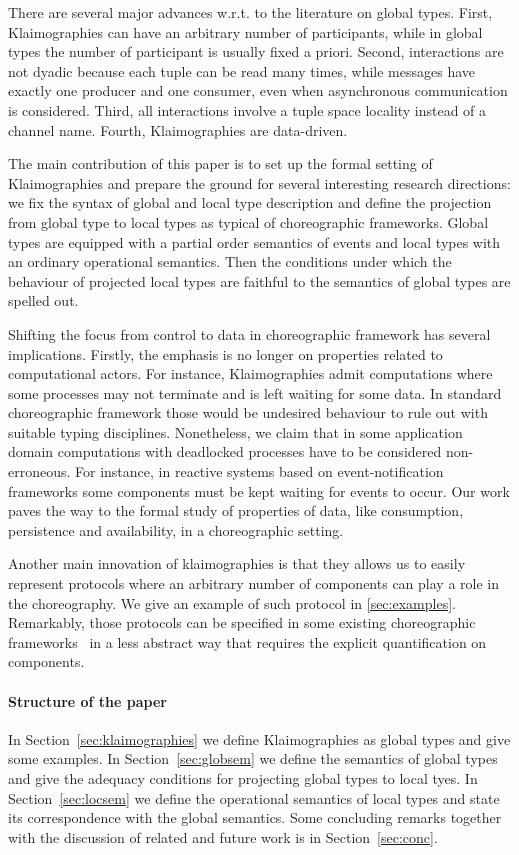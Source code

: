 There are several major advances w.r.t. to the literature on global types.
First, Klaimographies can have an arbitrary number of participants, while in global types the number of participant is usually fixed a priori.
Second, interactions are not dyadic because each tuple can be read many times, while messages have exactly one producer and one consumer, even when asynchronous communication is considered.
Third, all interactions involve a tuple space locality instead of a channel name.
Fourth, Klaimographies are data-driven.

The main contribution of this paper is to set up the formal setting of Klaimographies and prepare the ground for several interesting research directions: we fix the syntax of global and local type description and define the projection from global type to local types as typical of choreographic frameworks.
Global types are equipped with a partial order semantics of events and local types with an ordinary operational semantics. Then the conditions under which the behaviour of projected local types are faithful to the semantics of global types are spelled out. 

Shifting the focus from control to data in choreographic framework has
several implications.
%
Firstly, the emphasis is no longer on properties related to
computational actors.
%
For instance, Klaimographies admit computations where some processes
may not terminate and is left waiting for some data.
%
In standard choreographic framework those would be undesired behaviour
to rule out with suitable typing disciplines.
%
Nonetheless, we claim that in some application domain computations with
deadlocked processes have to be considered non-erroneous.
%
For instance, in reactive systems based on event-notification
frameworks some  components must be kept waiting for
events to occur.
%
Our work paves the way to the formal study of properties of data, like consumption, persistence and availability, in a choreographic setting.

Another main innovation of klaimographies is that they allows us to easily
represent protocols where an arbitrary number of components can
play a role in the choreography.
%
We give an example of such protocol in \cref{sec:examples}.
%
Remarkably, those protocols can be specified in some existing
choreographic frameworks~\cite{ydbh10,chjny19} in a less abstract way
that requires the explicit quantification on components.

\paragraph{Structure of the paper}
In Section~\ref{sec:klaimographies} we define Klaimographies as global types and give some examples.
In Section~\ref{sec:globsem} we define the semantics of global types and give the adequacy conditions for projecting global types to local tyes.
In Section~\ref{sec:locsem} we define the operational semantics of local types and state its correspondence with the global semantics.
Some concluding remarks together with the discussion of related and future work is in Section~\ref{sec:conc}.



